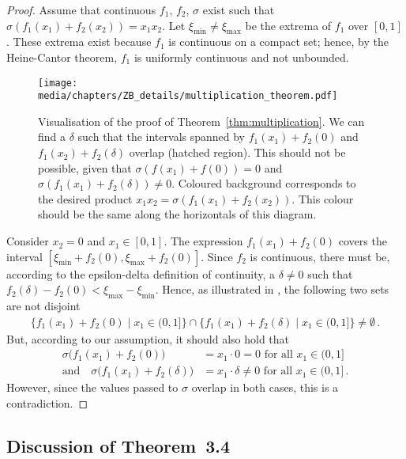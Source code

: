 \begin{proof}
Assume that continuous $f_1$, $f_2$, $\sigma$ exist such that $\sigma(f_1(x_1) + f_2(x_2)) = x_1 x_2$.
Let $\xi_\mathrm{min} \neq \xi_\mathrm{max}$ be the extrema of $f_1$ over $[0, 1]$.
These extrema exist because $f_1$ is continuous on a compact set; hence, by the Heine-Cantor theorem, $f_1$ is uniformly continuous and not unbounded.


\begin{figure}[t]
	\centering
	\texttt{[image: media/chapters/ZB\_details/multiplication\_theorem.pdf]}
	\caption[Visualisation of the proof of Theorem~\ref{thm:multiplication}]{Visualisation of the proof of Theorem~\ref{thm:multiplication}.
	We can find a $\delta$ such that the intervals spanned by $f_1(x_1) + f_2(0)$ and $f_1(x_2) + f_2(\delta)$ overlap (hatched region).
	This should not be possible, given that $\sigma(f(x_1) + f(0)) = 0$ and $\sigma(f_1(x_1) + f_2(\delta)) \neq 0$.
	Coloured background corresponds to the desired product $x_1 x_2 = \sigma(f_1(x_1) + f_2(x_2))$.
	This colour should be the same along the horizontals of this diagram.}
	\label{fig:multiplication_theorem}
\end{figure}

Consider $x_2 = 0$ and $x_1 \in [0, 1]$.
The expression $f_1(x_1) + f_2(0)$ covers the interval $[\xi_\mathrm{min} + f_2(0) , \xi_\mathrm{max} + f_2(0)]$.
Since $f_2$ is continuous, there must be, according to the epsilon-delta definition of continuity, a $\delta \neq 0$ such that $f_2(\delta) - f_2(0) < \xi_\mathrm{max} - \xi_\mathrm{min}$.
Hence, as illustrated in , the following two sets are not disjoint
\begin{align*}
	\bigl\{ f_1(x_1) + f_2(0) \mid x_1 \in (0, 1] \bigr\} \cap \bigl\{ f_1(x_1) + f_2(\delta) \mid x_1 \in (0, 1] \bigr\} \neq \emptyset \,.
\end{align*}
But, according to our assumption, it should also hold that
\begin{align*}
	\sigma\bigl(f_1(x_1) + f_2(0)\bigr) &= x_1 \cdot 0 = 0 \text{ for all } x_1 \in (0, 1] \\
	\text{and} \quad \sigma\bigl(f_1(x_1) + f_2(\delta)\bigr) &= x_1 \cdot \delta \neq 0 \text{ for all } x_1 \in (0, 1] \,.
\end{align*}
However, since the values passed to $\sigma$ overlap in both cases, this is a contradiction. \Lightning
\end{proof}

\subsection{Discussion of Theorem~3.4}
\label{app:thm_two_layer_universal}


